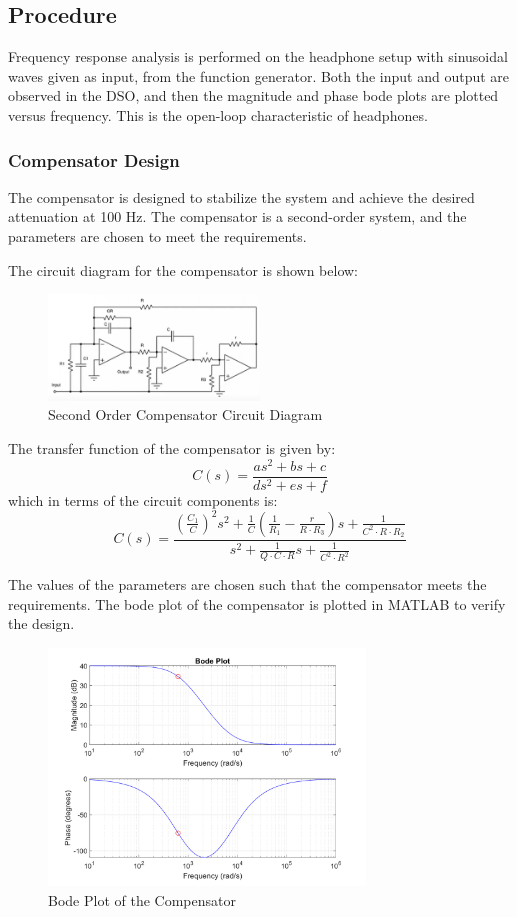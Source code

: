 \documentclass{article}
\begin{document}
\subsection{Procedure}

Frequency response analysis is performed on the headphone setup with sinusoidal waves given as input, from the function generator. Both the input and output are observed in the DSO, and then the magnitude and phase bode plots are plotted versus frequency. This is the open-loop characteristic of headphones.

\subsubsection{Compensator Design}

The compensator is designed to stabilize the system and achieve the desired attenuation at 100 Hz. The compensator is a second-order system, and the parameters are chosen to meet the requirements.

The circuit diagram for the compensator is shown below:
\begin{figure}[!htb]
    \centering
    \includegraphics[width=0.5\textwidth]{image.png}
    \caption{Second Order Compensator Circuit Diagram}
    \label{fig:compensator}
\end{figure}

The transfer function of the compensator is given by:
\[ C(s) = \frac{as^2 + bs + c}{ds^2 + es + f} \]
which in terms of the circuit components is:
$$ C(s) = \frac{\left(\frac{C_1}{C}\right)^2 s^2 + \frac{1}{C}\left(\frac{1}{R_1} - \frac{r}{R\cdot R_3}\right)s + \frac{1}{C^2\cdot R\cdot R_2}}{s^2 + \frac{1}{Q\cdot C\cdot R}s + \frac{1}{C^2\cdot R^2}} $$

The values of the parameters are chosen such that the compensator meets the requirements. The bode plot of the compensator is plotted in MATLAB to verify the design.

\begin{figure}
    \centering
    \includegraphics[width=0.75\textwidth]{bode-plot.png}
    \caption{Bode Plot of the Compensator}
    \label{fig:bode}
\end{figure}
\end{document}
